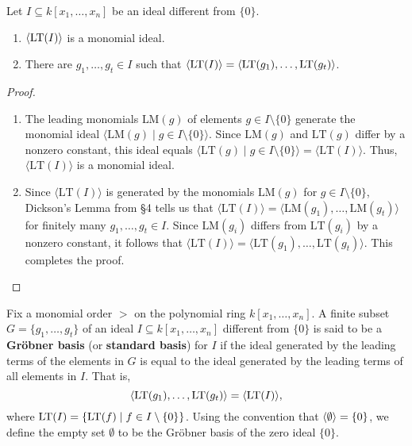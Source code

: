 \begin{theorem} %
    \label{thm:initialIdeal_is_FG}
    \leanok %
    Let $I \subseteq k[x_1, \ldots , x_n]$ be an ideal different from $\{ 0 \}$.
    \begin{enumerate}
        \item $\langle\operatorname{LT}(I)\rangle$ is a monomial ideal.
        \item There are $g_1, \ldots , g_t \in I$ such that $\langle \operatorname{LT}(I)\rangle = \langle \operatorname{LT}(g_1), \ldots , \operatorname{LT}(g_t)\rangle$.
    \end{enumerate}
\end{theorem}
\begin{proof}
\begin{enumerate}
    \item The leading monomials $\text{LM}(g)$ of elements $g \in I \setminus \{0\}$ generate the monomial ideal $\langle \text{LM}(g) \mid g \in I \setminus \{0\} \rangle$. 
      Since $\text{LM}(g)$ and $\text{LT}(g)$ differ by a nonzero constant, this ideal equals $\langle \text{LT}(g) \mid g \in I \setminus \{0\} \rangle = \langle \text{LT}(I) \rangle$. 
      Thus, $\langle \text{LT}(I) \rangle$ is a monomial ideal.
    \item Since $\langle \text{LT}(I) \rangle$ is generated by the monomials $\text{LM}(g)$ for $g \in I \setminus \{0\}$, Dickson's Lemma from \S4 tells us that $\langle \text{LT}(I) \rangle = \langle \text{LM}(g_1), \dots, \text{LM}(g_t) \rangle$ for finitely many $g_1, \dots, g_t \in I$. 
      Since $\text{LM}(g_i)$ differs from $\text{LT}(g_i)$ by a nonzero constant, it follows that $\langle \text{LT}(I) \rangle = \langle \text{LT}(g_1), \dots, \text{LT}(g_t) \rangle$. 
      This completes the proof.
\end{enumerate}
\end{proof}

\begin{definition}\label{def:Groebner_basis}
    \leanok %
    Fix a monomial order $>$ on the polynomial ring $k[x_1, \dots, x_n]$. 
    A finite subset $G = \{g_1, \dots, g_t\}$ of an ideal $I \subseteq k[x_1, \dots, x_n]$ different from $\{0\}$ 
    is said to be a \textbf{Gr{\"o}bner basis} (or \textbf{standard basis}) for $I$ if the ideal generated by the
    leading terms of the elements in $G$ is equal to the ideal generated by the leading terms of all elements in $I$.
    That is,
    \[ \langle \operatorname{LT}(g_1), \dots, \operatorname{LT}(g_t) \rangle = \langle \operatorname{LT}(I) \rangle, \]
    where $\operatorname{LT}(I) = \{\operatorname{LT}(f) \mid f \in I \setminus \{0\}\}$.
    Using the convention that $\langle \emptyset \rangle = \{0\}$, we define the empty set $\emptyset$
    to be the Gr{\"o}bner basis of the zero ideal $\{0\}$.
\end{definition}

